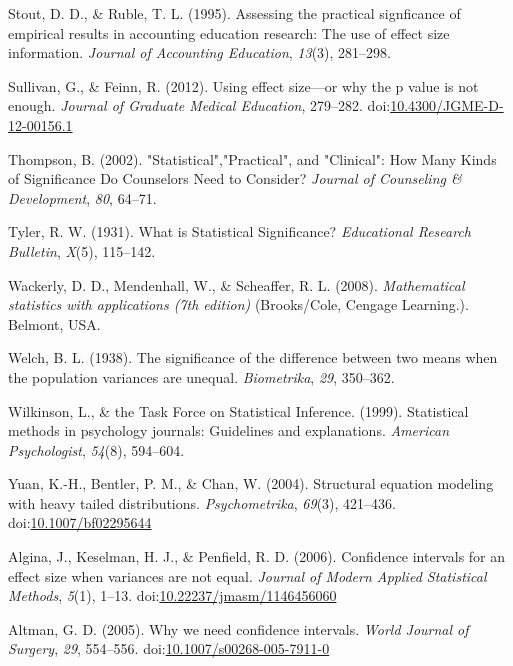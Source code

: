 \documentclass[
  man,floatsintext]{apa6}
\begin{document}
\leavevmode\hypertarget{ref-Stout_Ruble_1995}{}%
Stout, D. D., \& Ruble, T. L. (1995). Assessing the practical signficance of empirical results in accounting education research: The use of effect size information. \emph{Journal of Accounting Education}, \emph{13}(3), 281--298.

\leavevmode\hypertarget{ref-Sullivan_Feinn_2012}{}%
Sullivan, G., \& Feinn, R. (2012). Using effect size---or why the p value is not enough. \emph{Journal of Graduate Medical Education}, 279--282. doi:\href{https://doi.org/10.4300/JGME-D-12-00156.1}{10.4300/JGME-D-12-00156.1}

\leavevmode\hypertarget{ref-Thompson_2002}{}%
Thompson, B. (2002). "Statistical","Practical", and "Clinical": How Many Kinds of Significance Do Counselors Need to Consider? \emph{Journal of Counseling \& Development}, \emph{80}, 64--71.

\leavevmode\hypertarget{ref-Tyler_1931}{}%
Tyler, R. W. (1931). What is Statistical Significance? \emph{Educational Research Bulletin}, \emph{X}(5), 115--142.

\leavevmode\hypertarget{ref-Wackerly_et_al_2008}{}%
Wackerly, D. D., Mendenhall, W., \& Scheaffer, R. L. (2008). \emph{Mathematical statistics with applications (7th edition)} (Brooks/Cole, Cengage Learning.). Belmont, USA.

\leavevmode\hypertarget{ref-Welch_1938}{}%
Welch, B. L. (1938). The significance of the difference between two means when the population variances are unequal. \emph{Biometrika}, \emph{29}, 350--362.

\leavevmode\hypertarget{ref-Wilkinson_1999}{}%
Wilkinson, L., \& the Task Force on Statistical Inference. (1999). Statistical methods in psychology journals: Guidelines and explanations. \emph{American Psychologist}, \emph{54}(8), 594--604.

\leavevmode\hypertarget{ref-Yuan_et_al_2004}{}%
Yuan, K.-H., Bentler, P. M., \& Chan, W. (2004). Structural equation modeling with heavy tailed distributions. \emph{Psychometrika}, \emph{69}(3), 421--436. doi:\href{https://doi.org/10.1007/bf02295644}{10.1007/bf02295644}

\leavevmode\hypertarget{ref-Algina_et_al_2006}{}%
Algina, J., Keselman, H. J., \& Penfield, R. D. (2006). Confidence intervals for an effect size when variances are not equal. \emph{Journal of Modern Applied Statistical Methods}, \emph{5}(1), 1--13. doi:\href{https://doi.org/10.22237/jmasm/1146456060}{10.22237/jmasm/1146456060}

\leavevmode\hypertarget{ref-Altman_2005}{}%
Altman, G. D. (2005). Why we need confidence intervals. \emph{World Journal of Surgery}, \emph{29}, 554--556. doi:\href{https://doi.org/10.1007/s00268-005-7911-0}{10.1007/s00268-005-7911-0}
\end{document}
